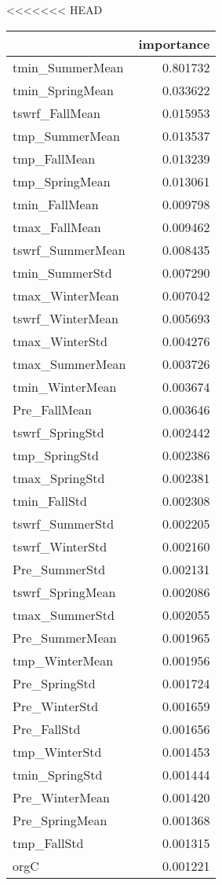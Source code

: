 <<<<<<< HEAD
\begin{tabular}{lr}
\toprule
 & importance \\
\midrule
tmin_SummerMean & 0.801732 \\
tmin_SpringMean & 0.033622 \\
tswrf_FallMean & 0.015953 \\
tmp_SummerMean & 0.013537 \\
tmp_FallMean & 0.013239 \\
tmp_SpringMean & 0.013061 \\
tmin_FallMean & 0.009798 \\
tmax_FallMean & 0.009462 \\
tswrf_SummerMean & 0.008435 \\
tmin_SummerStd & 0.007290 \\
tmax_WinterMean & 0.007042 \\
tswrf_WinterMean & 0.005693 \\
tmax_WinterStd & 0.004276 \\
tmax_SummerMean & 0.003726 \\
tmin_WinterMean & 0.003674 \\
Pre_FallMean & 0.003646 \\
tswrf_SpringStd & 0.002442 \\
tmp_SpringStd & 0.002386 \\
tmax_SpringStd & 0.002381 \\
tmin_FallStd & 0.002308 \\
tswrf_SummerStd & 0.002205 \\
tswrf_WinterStd & 0.002160 \\
Pre_SummerStd & 0.002131 \\
tswrf_SpringMean & 0.002086 \\
tmax_SummerStd & 0.002055 \\
Pre_SummerMean & 0.001965 \\
tmp_WinterMean & 0.001956 \\
Pre_SpringStd & 0.001724 \\
Pre_WinterStd & 0.001659 \\
Pre_FallStd & 0.001656 \\
tmp_WinterStd & 0.001453 \\
tmin_SpringStd & 0.001444 \\
Pre_WinterMean & 0.001420 \\
Pre_SpringMean & 0.001368 \\
tmp_FallStd & 0.001315 \\
orgC & 0.001221 \\

\end{tabular}
